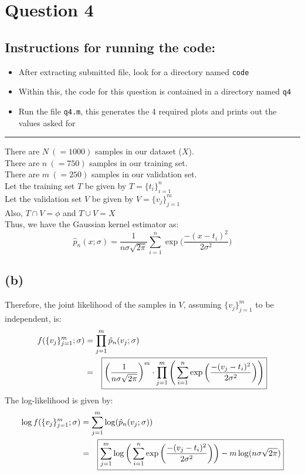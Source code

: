 \documentclass[11pt, fleqn]{article}
\begin{document}
\newpage
\section*{Question 4}
\setcounter{equation}{0}
\subsection*{Instructions for running the code:}
\begin{itemize}[itemsep=-0.6ex]
    \item After extracting submitted file, look for a directory named \texttt{code}
    \item Within this, the code for this question is contained in a directory named \texttt{q4}
    \item Run the file \texttt{q4.m}, this generates the 4 required plots and prints out the values asked for
\end{itemize}
\hrule
\vspace{15pt}
There are $N\ (=1000)$ samples in our dataset ($X$).\\
There are $n\ (=750)$ samples in our training set.\\
There are $m\ (=250)$ samples in our validation set.\\
Let the training set $T$ be given by $T = \{t_i\}_{i=1}^n$\\
Let the validation set $V$ be given by $V = \{v_j\}_{j=1}^m$\\
Also, $T\cap V = \phi$ and $T \cup V = X$\\
Thus, we have the Gaussian kernel estimator as:\\
$$
\hat p_n(x;\sigma) = \frac{1}{n\sigma\sqrt{2\pi}} \sum_{i=1}^{n}\exp\bigg(\frac{-(x - t_i)^2}{2\sigma^2} \bigg)
$$
\subsection*{(b)}
Therefore, the joint likelihood of the samples in $V$, assuming $\{v_j\}_{j=1}^{m}$ to be independent, is:
$$
\begin{aligned}
    f(\{v_j\}_{j=1}^{m}; \sigma) &= \prod_{j=1}^m \hat p_n(v_j;\sigma)\\
    &= \Aboxed{\bigg(\frac{1}{n\sigma\sqrt{2\pi}}\bigg)^m\cdot \prod_{j=1}^m\Bigg( \sum_{i=1}^{n}\exp\bigg(\frac{-(v_j - t_i)^2}{2\sigma^2} \bigg) \Bigg)}
\end{aligned}
$$
The log-likelihood is given by:
$$
\begin{aligned}
    \log f(\{v_j\}_{j=1}^{m}; \sigma) &= \sum_{j=1}^m \log (\hat p_n(v_j;\sigma))\\
    &= \Aboxed{\sum_{j=1}^m \log \bigg(\sum_{i=1}^{n}\exp\bigg(\frac{-(v_j - t_i)^2}{2\sigma^2} \bigg)\bigg) - m\log(n\sigma\sqrt{2\pi})}
\end{aligned}
$$
\end{document}

